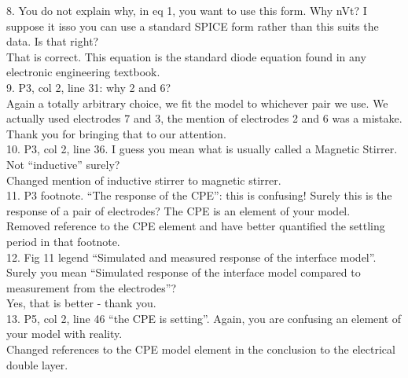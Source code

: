 \documentclass[journal, a4paper]{IEEEtran}
\begin{document}
{8. You do not explain why, in eq 1, you want to use this form. Why nVt? I suppose it isso you can use a standard SPICE form rather than this suits the data. Is that right?\\
{\color{OliveGreen} That is correct. This equation is the standard diode equation found in any electronic engineering textbook.}\\


9. P3, col 2, line 31: why 2 and 6?\\
{\color{OliveGreen} Again a totally arbitrary choice, we fit the model to whichever pair we use. We actually used electrodes 7 and 3, the mention of electrodes 2 and 6 was a mistake. Thank you for bringing that to our attention.}\\


10. P3, col 2, line 36. I guess you mean what is usually called a Magnetic Stirrer. Not ``inductive'' surely?\\
{\color{OliveGreen} Changed mention of inductive stirrer to magnetic stirrer.}\\


11. P3 footnote. ``The response of the CPE'': this is confusing! Surely this is the response of a pair of electrodes? The CPE is an element of your model.\\
{\color{OliveGreen}Removed reference to the CPE element and have better quantified the settling period in that footnote.}\\


12. Fig 11 legend ``Simulated and measured response of the interface model''. Surely you mean ``Simulated response of the interface model compared to measurement from the electrodes''?\\
{\color{OliveGreen} Yes, that is better - thank you.}\\



13. P5, col 2, line 46 ``the CPE is setting''. Again, you are confusing an element of your model with reality.\\
{\color{OliveGreen}Changed references to the CPE model element in the conclusion to the electrical double layer.}\\


}
\end{document}
